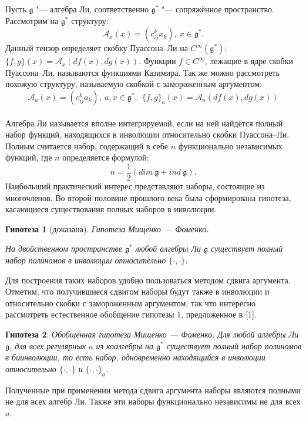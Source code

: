


\newtheorem{conjecture}{Гипотеза}



\vzmscaption


Пусть $\mathfrak{g}$ "--- алгебра Ли, соответственно ${\mathfrak{g}}^*$ "--- сопряжённое пространство. Рассмотрим на ${\mathfrak{g}^*}$ структуру:
$$
\mathcal{A}_x(x)=(c_{ij}^{k}x_k), \ x\in \mathfrak{g}^*.
$$
Данный тензор определяет скобку Пуассона--Ли на $C^{\infty}(\mathfrak{g}^*)$: $
\{f,g\}(x)=\mathcal{A}_{x}(df(x),dg(x))
$. Функции $f\in C^{\infty}$, лежащие в ядре скобки Пуассона--Ли, называются функциями Казимира.
Так же можно рассмотреть похожую структуру, называемую скобкой с замороженным аргументом:
$$
\mathcal{A}_a(x)=(c_{ij}^{k}a_k), \ a, x\in \mathfrak{g}^*, \ \ \{f,g\}_a(x)=\mathcal{A}_{a}(df(x),dg(x))
$$
\\
Алгебра Ли называется вполне интегрируемой, если на ней найдётся полный набор функций, находящихся в инволюции относительно скобки Пуассона--Ли. Полным считается набор, содержащий в себе $n$ функционально независимых функций, где $n$ определяется формулой:
$$
n = \frac1 2 (dim\ \mathfrak{g}+ind\ \mathfrak{g}).
$$
Наибольший практический интерес представляют наборы, состоящие из многочленов. Во второй половине прошлого века была сформирована гипотеза, касающиеся существования полных наборов в инволюции.
\begin{conjecture}[доказана]{Гипотеза Мищенко --- Фоменко.}

На двойственном пространстве $\mathfrak{g}^*$ любой алгебры Ли $\mathfrak{g}$ существует полный набор полиномов в инволюции относительно $\{\cdot,\cdot\}$.
\end{conjecture}
Для построения таких наборов удобно пользоваться методом сдвига аргумента.
    Отметим, что получившиеся сдвигом наборы будут также в инволюции и относительно скобки с замороженным аргументом, так что интересно рассмотреть естественное обобщение гипотезы 1, предложенное в [1].
    \begin{conjecture}
    {Обобщённая гипотеза Мищенко --- Фоменко.} Для любой алгебры Ли $\mathfrak{g}$, для всех регулярных $a$ из коалгебры на $\mathfrak{g}^*$  существует полный набор полиномов в биинволюции, то есть набор, одновременно находящийся в инволюции относительно $\{\cdot,\cdot\}$  и $\{\cdot,\cdot\}_a$.
    \end{conjecture}
   Полученные при применении метода сдвига аргумента наборы являются полными не для всех алгебр Ли. Также эти наборы функционально независимы не для всех $a$.


